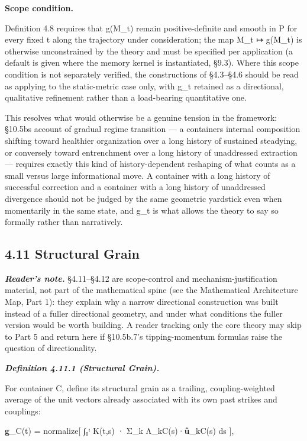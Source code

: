 \documentclass[
]{article}
\begin{document}
\textbf{Scope condition.}

Definition 4.8 requires that g(M\_t) remain positive-definite and smooth
in P for every fixed t along the trajectory under consideration; the map
M\_t ↦ g(M\_t) is otherwise unconstrained by the theory and must be
specified per application (a default is given where the memory kernel is
instantiated, §9.3). Where this scope condition is not separately
verified, the constructions of §4.3--§4.6 should be read as applying to
the static-metric case only, with g\_t retained as a directional,
qualitative refinement rather than a load-bearing quantitative one.

This resolves what would otherwise be a genuine tension in the
framework: §10.5bs account of gradual regime transition --- a containers
internal composition shifting toward healthier organization over a long
history of sustained steadying, or conversely toward entrenchment over a
long history of unaddressed extraction --- requires exactly this kind of
history-dependent reshaping of what counts as a small versus large
informational move. A container with a long history of successful
correction and a container with a long history of unaddressed divergence
should not be judged by the same geometric yardstick even when
momentarily in the same state, and g\_t is what allows the theory to say
so formally rather than narratively.

\hypertarget{structural-grain}{%
\subsection{4.11 Structural Grain}\label{structural-grain}}

\emph{\textbf{Reader's note.}} §4.11--§4.12 are scope-control and
mechanism-justification material, not part of the mathematical spine
(see the Mathematical Architecture Map, Part 1): they explain why a
narrow directional construction was built instead of a fuller
directional geometry, and under what conditions the fuller version would
be worth building. A reader tracking only the core theory may skip to
Part 5 and return here if §10.5b.7's tipping-momentum formulas raise the
question of directionality.

\emph{\textbf{Definition 4.11.1 (Structural Grain).}}

For container C, define its structural grain as a trailing,
coupling-weighted average of the unit vectors already associated with
its own past strikes and couplings:

\textbf{g}\_C(t) = normalize{[} ∫₀ᵗ K(t,s) · Σ\_k
Λ\_kC(s)·\textbf{û}\_kC(s) ds {]},
\end{document}
